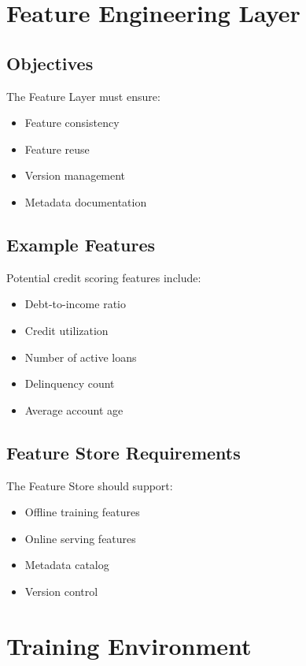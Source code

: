 \section{Feature Engineering Layer}

\subsection{Objectives}

The Feature Layer must ensure:

\begin{itemize}
    \item Feature consistency
    \item Feature reuse
    \item Version management
    \item Metadata documentation
\end{itemize}

\subsection{Example Features}

Potential credit scoring features include:

\begin{itemize}
    \item Debt-to-income ratio
    \item Credit utilization
    \item Number of active loans
    \item Delinquency count
    \item Average account age
\end{itemize}

\subsection{Feature Store Requirements}

The Feature Store should support:

\begin{itemize}
    \item Offline training features
    \item Online serving features
    \item Metadata catalog
    \item Version control
\end{itemize}

\section{Training Environment}


